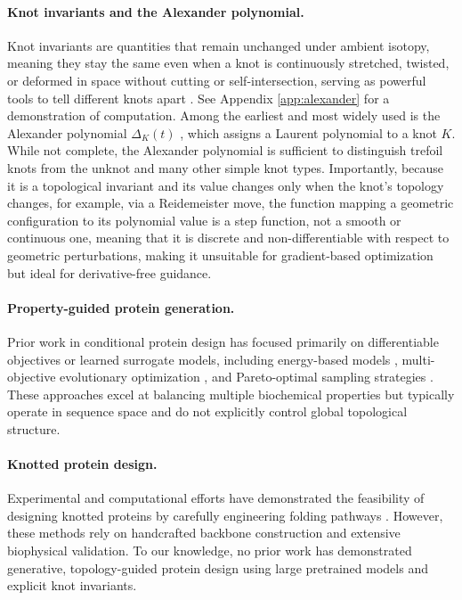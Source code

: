 \documentclass{article}
\begin{document}
\paragraph{Knot invariants and the Alexander polynomial.}
Knot invariants are quantities that remain unchanged under ambient isotopy, meaning they stay the same even when a knot is continuously stretched, twisted, or deformed 
in space without cutting or self-intersection, serving as powerful tools to tell different knots apart \cite{Adams2004}. See Appendix \ref{app:alexander} for a demonstration of computation. 
Among the earliest and most widely used is the Alexander polynomial $\Delta_K(t)$ \cite{Alexander1928}, which assigns a Laurent polynomial to a knot $K$.
While not complete, the Alexander polynomial is sufficient to distinguish trefoil knots from the unknot and many other simple knot types.
Importantly, because it is a topological invariant and its value changes only when the knot's topology changes, for example, via a Reidemeister move, the function mapping a geometric configuration to its polynomial value is a step function, not a smooth or continuous one, 
meaning that it is discrete and non-differentiable with respect to geometric perturbations, making it unsuitable for gradient-based optimization but ideal for derivative-free guidance.

\paragraph{Property-guided protein generation.}
Prior work in conditional protein design has focused primarily on differentiable objectives or learned surrogate models, including energy-based models \cite{Tagasovska2022}, multi-objective evolutionary optimization \cite{Hong2024}, and Pareto-optimal sampling strategies \cite{Luo2025}.
These approaches excel at balancing multiple biochemical properties but typically operate in sequence space and do not explicitly control global topological structure.

\paragraph{Knotted protein design.}
Experimental and computational efforts have demonstrated the feasibility of designing knotted proteins by carefully engineering folding pathways \cite{King2010,Doyle2023}.
However, these methods rely on handcrafted backbone construction and extensive biophysical validation.
To our knowledge, no prior work has demonstrated generative, topology-guided protein design using large pretrained models and explicit knot invariants.
\end{document}
